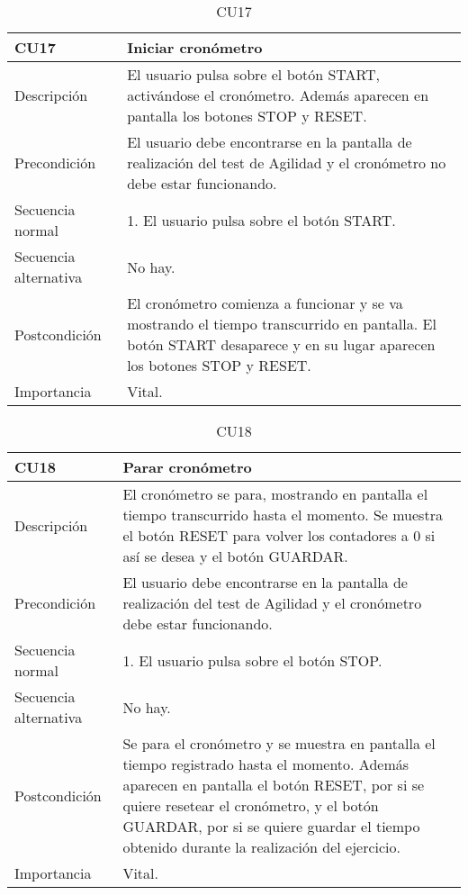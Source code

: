 \begin{table}[H]
\label{CU17}
\begin{center}
\begin{tabular}{| l | p{10cm} |}
\hline
CU17 & Iniciar cronómetro\\
\hline
Descripción & El usuario pulsa sobre el botón START, activándose el cronómetro. Además aparecen en pantalla los botones STOP y RESET.\\
\hline
Precondición & El usuario debe encontrarse en la pantalla de realización del test de Agilidad y el cronómetro no debe estar funcionando.\\
\hline
Secuencia normal & 1. El usuario pulsa sobre el botón START.\\
\hline
Secuencia alternativa & No hay.\\
\hline
Postcondición & El cronómetro comienza a funcionar y se va mostrando el tiempo transcurrido en pantalla. El botón START desaparece y en su lugar aparecen los botones STOP y RESET.\\
\hline
Importancia & Vital.\\
\hline
\end{tabular}
\end{center}
\caption{CU17}
\end{table}

\begin{table}[H]
\label{CU18}
\begin{center}
\begin{tabular}{| l | p{10cm} |}
\hline
CU18 & Parar cronómetro\\
\hline
Descripción & El cronómetro se para, mostrando en pantalla el tiempo transcurrido hasta el momento. Se muestra el botón RESET para volver los contadores a 0 si así se desea y el botón GUARDAR.\\
\hline
Precondición & El usuario debe encontrarse en la pantalla de realización del test de Agilidad y el cronómetro debe estar funcionando.\\
\hline
Secuencia normal & 1. El usuario pulsa sobre el botón STOP.\\
\hline
Secuencia alternativa & No hay.\\
\hline
Postcondición & Se para el cronómetro y se muestra en pantalla el tiempo registrado hasta el momento. Además aparecen en pantalla el botón RESET, por si se quiere resetear el cronómetro, y el botón GUARDAR, por si se quiere guardar el tiempo obtenido durante la realización del ejercicio.\\
\hline
Importancia & Vital.\\
\hline
\end{tabular}
\end{center}
\caption{CU18}
\end{table}

